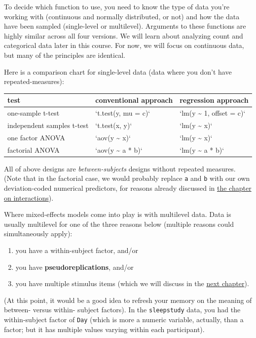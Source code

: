 \documentclass[]{book}
\providecommand{\tightlist}{%
  \setlength{\itemsep}{0pt}\setlength{\parskip}{0pt}}
\begin{document}
To decide which function to use, you need to know the type of data you're working with (continuous and normally distributed, or not) and how the data have been sampled (single-level or multilevel). Arguments to these functions are highly similar across all four versions. We will learn about analyzing count and categorical data later in this course. For now, we will focus on continuous data, but many of the principles are identical.

Here is a comparison chart for single-level data (data where you don't have repeated-measures):

\begin{tabular}{l|l|l}
\hline
test & conventional approach & regression approach\\
\hline
one-sample t-test & `t.test(y, mu = c)` & `lm(y \textasciitilde{} 1, offset = c)`\\
\hline
independent samples t-test & `t.test(x, y)` & `lm(y \textasciitilde{} x)`\\
\hline
one factor ANOVA & `aov(y \textasciitilde{} x)` & `lm(y \textasciitilde{} x)`\\
\hline
factorial ANOVA & `aov(y \textasciitilde{} a * b)` & `lm(y \textasciitilde{} a * b)`\\
\hline
\end{tabular}

All of above designs are \emph{between-subjects} designs without repeated measures. (Note that in the factorial case, we would probably replace \texttt{a} and \texttt{b} with our own deviation-coded numerical predictors, for reasons already discussed in \href{interactions.html}{the chapter on interactions}).

Where mixed-effects models come into play is with multilevel data. Data is usually multilevel for one of the three reasons below (multiple reasons could simultaneously apply):

\begin{enumerate}
\def\labelenumi{\arabic{enumi}.}
\tightlist
\item
  you have a within-subject factor, and/or
\item
  you have \textbf{pseudoreplications}, and/or
\item
  you have multiple stimulus items (which we will discuss in the \href{linear-mixed-effects-models-with-crossed-random-factors.html}{next chapter}).
\end{enumerate}

(At this point, it would be a good idea to refresh your memory on the meaning of between- versus within- subject factors). In the \texttt{sleepstudy} data, you had the within-subject factor of \texttt{Day} (which is more a numeric variable, actually, than a factor; but it has multiple values varying within each participant).
\end{document}
